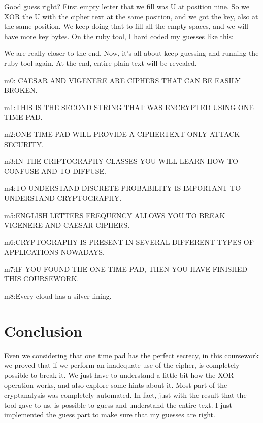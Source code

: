 \documentclass[journal]{IEEEtran}
\begin{document}
Good guess right? First empty letter that we fill was U at position nine. So we XOR the U with the cipher text at the same position, and we got the key, also at the same position. We keep doing that to fill all the empty spaces, and we will have more key bytes. On the ruby tool, I hard coded my guesses like this:



We are really closer to the end. Now, it's all about keep guessing and running the ruby tool again. At the end, entire plain text will be revealed.

m0:    CAESAR   AND   VIGENERE   ARE  CIPHERS THAT   CAN BE   EASILY   BROKEN.

m1:THIS  IS THE  SECOND   STRING THAT  WAS  ENCRYPTED  USING  ONE TIME    PAD.

m2:ONE TIME PAD WILL PROVIDE A  CIPHERTEXT ONLY ATTACK SECURITY.

m3:IN THE  CRIPTOGRAPHY  CLASSES YOU WILL LEARN HOW TO CONFUSE AND TO DIFFUSE.

m4:TO UNDERSTAND DISCRETE PROBABILITY IS IMPORTANT TO UNDERSTAND CRYPTOGRAPHY.

m5:ENGLISH LETTERS FREQUENCY ALLOWS YOU TO BREAK VIGENERE AND CAESAR CIPHERS.

m6:CRYPTOGRAPHY IS PRESENT IN SEVERAL DIFFERENT TYPES OF APPLICATIONS NOWADAYS.

m7:IF YOU FOUND THE ONE TIME PAD, THEN YOU HAVE FINISHED THIS  COURSEWORK.

m8:Every cloud has a silver lining.

\section{Conclusion}
Even we considering that one time pad has the perfect secrecy, in this coursework we proved that if we perform an inadequate use of the cipher, is completely possible to break it. We just have to understand a little bit how the XOR operation works, and also explore some hints about it. Most part of the cryptanalysis was completely automated. In fact, just with the result that the tool gave to us, is possible to guess and understand the entire text. I just implemented the guess part to make sure that my guesses are right.

\end{document}
